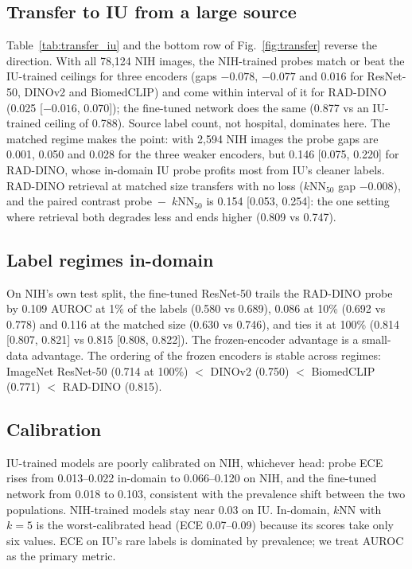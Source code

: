 \documentclass[conference]{IEEEtran}
\begin{document}
\subsection{Transfer to IU from a large source}
Table~\ref{tab:transfer_iu} and the bottom row of Fig.~\ref{fig:transfer} reverse the direction. With all 78,124 NIH images, the NIH-trained probes match or beat the IU-trained ceilings for three encoders (gaps $-0.078$, $-0.077$ and $0.016$ for ResNet-50, DINOv2 and BiomedCLIP) and come within interval of it for RAD-DINO (0.025 [$-0.016$, 0.070]); the fine-tuned network does the same (0.877 vs an IU-trained ceiling of 0.788). Source label count, not hospital, dominates here. The matched regime makes the point: with 2,594 NIH images the probe gaps are 0.001, 0.050 and 0.028 for the three weaker encoders, but 0.146 [0.075, 0.220] for RAD-DINO, whose in-domain IU probe profits most from IU's cleaner labels. RAD-DINO retrieval at matched size transfers with no loss ($k$NN$_{50}$ gap $-0.008$), and the paired contrast probe~$-$~$k$NN$_{50}$ is 0.154 [0.053, 0.254]: the one setting where retrieval both degrades less and ends higher (0.809 vs 0.747).


\subsection{Label regimes in-domain}
On NIH's own test split, the fine-tuned ResNet-50 trails the RAD-DINO probe by 0.109 AUROC at 1\% of the labels (0.580 vs 0.689), 0.086 at 10\% (0.692 vs 0.778) and 0.116 at the matched size (0.630 vs 0.746), and ties it at 100\% (0.814 [0.807, 0.821] vs 0.815 [0.808, 0.822]). The frozen-encoder advantage is a small-data advantage. The ordering of the frozen encoders is stable across regimes: ImageNet ResNet-50 (0.714 at 100\%) $<$ DINOv2 (0.750) $<$ BiomedCLIP (0.771) $<$ RAD-DINO (0.815).

\subsection{Calibration}
IU-trained models are poorly calibrated on NIH, whichever head: probe ECE rises from 0.013--0.022 in-domain to 0.066--0.120 on NIH, and the fine-tuned network from 0.018 to 0.103, consistent with the prevalence shift between the two populations. NIH-trained models stay near 0.03 on IU. In-domain, $k$NN with $k=5$ is the worst-calibrated head (ECE 0.07--0.09) because its scores take only six values. ECE on IU's rare labels is dominated by prevalence; we treat AUROC as the primary metric.
\end{document}
